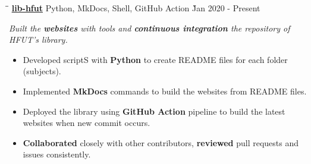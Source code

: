 \documentclass{res}
\begin{document}
\begin{resume}
    \vspace{-0.2in}	 
    \begin{tabbing}
    \hspace{2.391in}\= \hspace{3in}\= \kill %
    \href{https://github.com/lib-hfut/lib-hfut}{\bf lib-hfut}  \> 
                Python, MkDocs, Shell, GitHub Action \` Jan 2020 - Present \\
    \end{tabbing}\vspace{-20pt}      %
    \vspace{-0.13in}
    \textit{Built the {\bf websites} with tools and {\bf continuous integration} the repository of 
            HFUT's library.}
    \vspace{+0.05in}
    \begin{itemize} \itemsep 0.5pt %
        \item Developed scriptS with {\bf Python} to create README files for each folder (subjects). 
        \item Implemented {\bf MkDocs} commands to build the websites from README files.
        \item Deployed the library using {\bf GitHub Action} pipeline to build the latest websites 
                when new commit occurs.
        \item {\bf Collaborated} closely with other contributors, {\bf reviewed} 
                pull requests and issues consistently.
    \end{itemize}

\end{resume}
\end{document}
